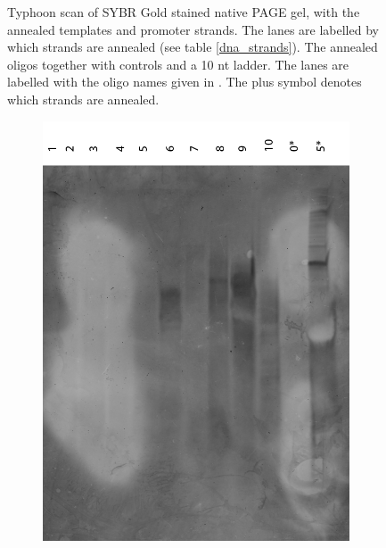 \begin{figure}[h]
\begin{subfigure}[t]{0.46\textwidth}
  \caption{}
  \label{translator_annealing_2}
\end{subfigure}
\caption{ Typhoon scan of SYBR Gold stained native PAGE gel, with the annealed templates and promoter strands. The lanes are labelled by which strands are annealed (see table \ref{dna_strands}).  The annealed oligos together with controls and a 10 nt ladder. The lanes are labelled with the oligo names given in . The plus symbol denotes which strands are annealed.}
\end{figure}

\begin{figure}[h]
  \begin{subfigure}[t]{0.49\textwidth}
  \includegraphics[width=\textwidth]{images/translator_transcription_1.png}
  \caption{}
  \label{transcription_1}
  \end{subfigure}
  \begin{subfigure}[t]{0.49\textwidth}

\end{subfigure}
\end{figure}
